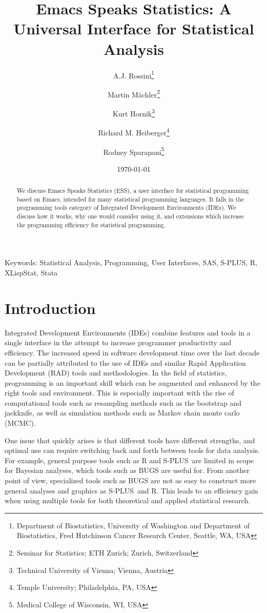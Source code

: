 \documentclass{article}
\title{Emacs Speaks Statistics: A Universal Interface for
  Statistical Analysis}
\author{A.J. Rossini\footnote{Department of Biostatistics, University
    of Washington and Department of Biostatistics, Fred Hutchinson
    Cancer Research Center, Seattle, WA, USA} \and Martin
  M{\"a}chler\footnote{Seminar for Statistics; ETH Zurich; Zurich,
    Switzerland} \and Kurt 
  Hornik\footnote{Technical University of Vienna; Vienna, Austria} \and
  Richard M. Heiberger\footnote{Temple University; Philadelphia, PA,
    USA} \and Rodney Sparapani\footnote{Medical College of Wisconsin,
    WI, USA}}
\date{\today}
\newif\ifpdf
\newcommand*{\Splus}{\textsc{S-PLUS}}
\begin{document}
\ifpdf
  \DeclareGraphicsExtensions{.jpg,.pdf,.png,.mps}
\fi


\maketitle

Keywords: Statistical Analysis, Programming, User Interfaces, SAS,
S-PLUS, R, XLispStat, Stata

\begin{abstract}
  We discuss Emacs Speaks Statistics (ESS), a user interface for
  statistical programming based on Emacs, intended for many
  statistical programming languages.  It falls in the programming
  tools category of Integrated Development Environments (IDEs).  We
  discuss how it works, why one would consider using it, and
  extensions which increase the programming efficiency for statistical
  programming.
\end{abstract}

\section{Introduction}
\label{sec:intro}

Integrated Development Environments (IDEs) combine features and tools
in a single interface in the attempt to increase programmer
productivity and efficiency.  The increased speed in software
development time over the last decade can be partially attributed to
the use of IDEs and similar Rapid Application Development (RAD) tools
and methodologies.  In the field of statistics, programming is an
important skill which can be augmented and enhanced by the right tools
and environment.  This is especially important with the rise of
computational tools such as resampling methods such as the bootstrap
and jackknife, as well as simulation methods such as Markov chain
monte carlo (MCMC).  

One issue that quickly arises is that different tools have different
strengths, and optimal use can require switching back and forth
between tools for data analysis.  For example, general purpose tools
such as R \citep{ihak:gent:1996} and \Splus\ are limited in scope for
Bayesian analyses, which tools such as BUGS are useful for.  From
another point of view, specialized tools such as BUGS are not as easy
to construct more general analyses and graphics as \Splus\ and R.  This
leads to an efficiency gain when using multiple tools for both
theoretical and applied statistical research.
\end{document}
